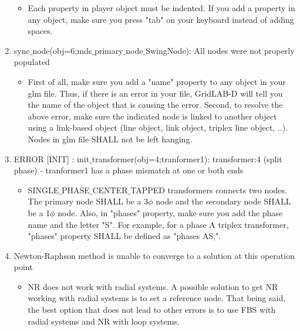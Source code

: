 \documentclass{article}
\begin{document}
\begin{enumerate}
        \begin{itemize}
            \item Each property in player object must be indented. If you add a property in any object, make sure you press "tab" on your keyboard instead of adding spaces.
        \end{itemize}
        \item sync$\_$node(obj=6;mds$\_$primary$\_$node$\_$SwingNode): All nodes were not properly populated
        \begin{itemize}
            \item First of all, make sure you add a "name" property to any object in your glm file. Thus, if there is an error in your file, GridLAB-D will tell you the name of the object that is causing the error. Second, to resolve the above error, make sure the indicated node is linked to another object using a link-based object (line object, link object, triplex line object, ..). Nodes in glm file SHALL not be left hanging.
        \end{itemize}
        \item ERROR [INIT] : init$\_$transformer(obj=4;tranformer1): transformer:4 (split phase) - tranformer1 has a phase mismatch at one or both ends
        \begin{itemize}
            \item SINGLE$\_$PHASE$\_$CENTER$\_$TAPPED transformers connects two nodes. The primary node SHALL be a 3$\phi$ node and the secondary node SHALL be a 1$\phi$ node. Also, in "phases" property, make sure you add the phase name and the letter "S". For example, for a phase A triplex transformer, "phases" property SHALL be defined as "phases AS;".
        \end{itemize}
        \item Newton-Raphson method is unable to converge to a solution at this operation point
        \begin{itemize}
            \item NR does not work with radial systems. A possible solution to get NR working with radial systems is to set a reference node. That being said, the best option that does not lead to other errors is to use FBS with radial systems and NR with loop systems.
        \end{itemize}
    \end{enumerate}
    \newpage
\listofwarnings
\end{document}
